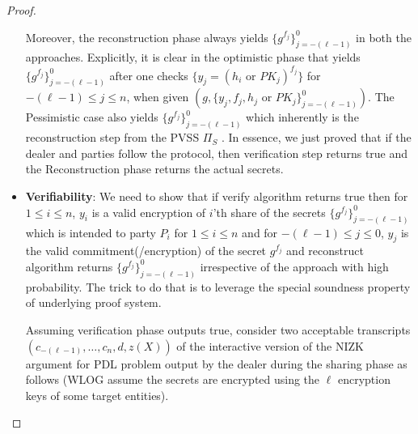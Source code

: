\begin{proof}
\begin{itemize}
    Moreover, the reconstruction phase always yields $\{g^{f_j}\}_{j=-(\ell-1)}^0$ in both the approaches. Explicitly, it is 
    clear in the optimistic phase that yields $\{g^{f_j}\}_{j=-(\ell-1)}^0$ after one checks $\{y_j=(h_i\text{ or }PK_j)^{f_j}\}$ for $-(\ell-1)\leq j\leq n$,  
    when given $(g,\{y_j,f_j,h_j\text{ or }PK_j\}_{j=-(\ell-1)}^0)$. The Pessimistic case also yields 
    $\{g^{f_j}\}_{j=-(\ell-1)}^0$ which inherently is the reconstruction step from the PVSS $\Pi_S$ \cite{cryptoeprint:2023/1669}. 
    In essence, we just proved that if the dealer and parties follow the protocol, then verification step returns 
    true and the Reconstruction phase returns the actual secrets.

    \item \textbf{Verifiability}: We need to show that if verify algorithm returns true then for $1\leq i\leq n$, 
    $y_i$ is a valid encryption of $i$'th share of the secrets $\{g^{f_j}\}_{j=-(\ell-1)}^0$ which is intended to party $P_i$ 
    for $1\leq i\leq n$ and for $-(\ell-1)\leq j\leq 0$, $y_j$ is the valid commitment(/encryption) of the secret $g^{f_j}$ and 
    reconstruct algorithm returns $\{g^{f_j}\}_{j=-(\ell-1)}^0$ irrespective of the approach with high probability. The 
    trick to do that is to leverage the special soundness property of underlying proof system.\par

    Assuming verification phase outputs true, consider two acceptable transcripts $(c_{-(\ell-1)},\dots,c_n,d,z(X))$ 
    of the interactive version of the NIZK argument for PDL problem output by the dealer during the sharing phase as 
    follows (WLOG assume the secrets are encrypted using the $\ell$ encryption keys of some target entities).


\end{itemize}
\end{proof}
